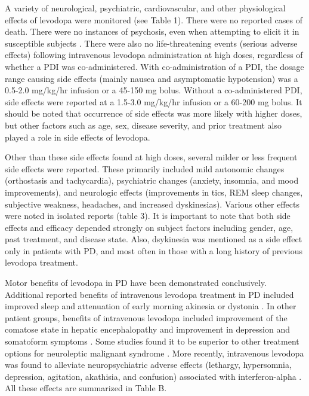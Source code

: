 A variety of neurological, psychiatric, cardiovascular, and other physiological effects of levodopa  were monitored (see Table 1). There were no reported cases of death.  There were no instances of psychosis, even when attempting to elicit it in susceptible subjects \cite{9748031}.  There were also no life-threatening events (serious adverse effects) following intravenous levodopa administration at high doses, regardless of whether a PDI was co-administered.  With co-administration of a PDI, the dosage range causing side effects (mainly nausea and asymptomatic hypotension) was a 0.5-2.0 mg/kg/hr infusion or a 45-150 mg bolus.  Without a co-administered PDI, side effects were reported at a 1.5-3.0 mg/kg/hr infusion or a 60-200 mg bolus. It should be noted that occurrence of side effects was more likely with higher doses, but other factors such as age, sex, disease severity, and prior treatment also played a role in side effects of levodopa.  

Other than these side effects found at high doses, several milder or less frequent side effects were reported. These primarily included mild autonomic changes (orthostasis and tachycardia), psychiatric changes (anxiety, insomnia, and mood improvements), and neurologic effects (improvements in tics, REM sleep changes, subjective weakness, headaches, and increased dyskinesias). Various other effects were noted in isolated reports (table 3). It is important to note that both side effects and efficacy depended strongly on subject factors including gender, age, past treatment, and disease state.  Also, dsykinesia was mentioned as a side effect only in patients with PD, and most often in those with a long history of previous levodopa treatment. 

Motor benefits of levodopa in PD have been demonstrated conclusively. Additional reported benefits of intravenous levodopa treatment in PD included improved sleep \cite{6722513} and attenuation of early morning akinesia or dystonia \cite{3601092}.  In other patient groups, benefits of intravenous levodopa included improvement of the comatose state in hepatic encephalopathy \cite{4544184} and improvement in depression and somatoform symptoms \cite{5898634}.  Some studies found it to be superior to other treatment options for neuroleptic malignant syndrome \cite{9099421}.  More recently, intravenous levodopa was found to alleviate neuropsychiatric adverse effects (lethargy, hypersomnia, depression, agitation, akathisia, and confusion) associated with interferon-alpha \cite{10682234}. All these effects are summarized in Table B.
